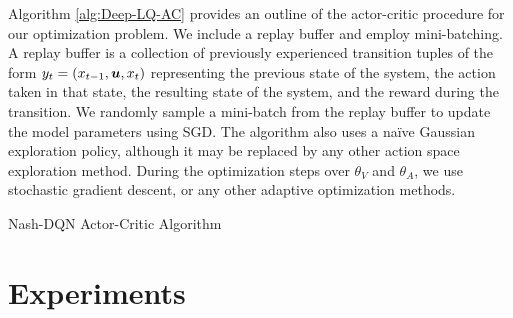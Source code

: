 \documentclass[onefignum,onetabnum]{siamonline171218}
\begin{document}
Algorithm \ref{alg:Deep-LQ-AC} provides an outline of the actor-critic procedure for our optimization problem. We include  a replay buffer and employ mini-batching. A replay buffer is a collection of previously experienced transition tuples of the form $y_t = (x_{t-1},{\bm{u}},x_t)$ representing the previous state of the system, the action taken in that state, the resulting state of the system, and the reward during the transition. We randomly sample a mini-batch from the replay buffer to update the model parameters using SGD. The algorithm also uses a na\"ive Gaussian exploration policy, although it may be  replaced by any other action space exploration method.
During the optimization steps over $\theta_V$ and $\theta_A$, we use stochastic gradient descent, or any other adaptive optimization methods.
\begin{algorithm}[t]
	 \;
	 \;
	 \;
	\caption{Nash-DQN Actor-Critic Algorithm}
	\label{alg:Deep-LQ-AC}
\end{algorithm}

\section{Experiments}
\label{sec:Experiments-Section}
\end{document}
